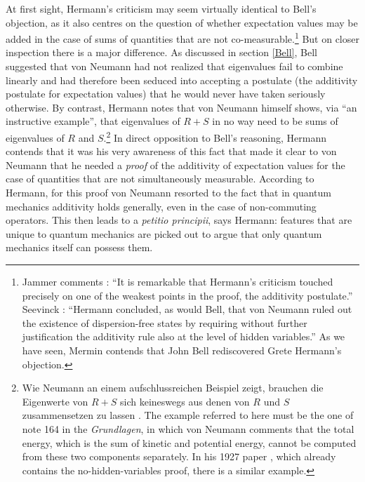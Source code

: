 \documentclass[12pt]{article}
\begin{document}
At first sight, Hermann's criticism may seem virtually identical to Bell's objection, as it also centres on the question of whether expectation values may be added in the case of sums of quantities that are not co-measurable.\footnote{Jammer comments \cite[p.\@ 274]{jammer}: ``It is remarkable that Hermann's criticism touched precisely on one of the weakest points in the proof, the additivity postulate.'' Seevinck \cite[p.\@ 122]{seevinck}: ``Hermann concluded, as would Bell, that von Neumann ruled out the existence of dispersion-free states by requiring without further justification the additivity rule also at the level of hidden variables.'' As we have seen, Mermin \cite{mermin} contends that John Bell rediscovered Grete Hermann's objection.} But on closer inspection there is a major difference. As discussed in section \ref{Bell}, Bell suggested that von Neumann had not realized that eigenvalues fail to combine linearly and had therefore been seduced into accepting a postulate (the additivity postulate for expectation values) that he would never have taken seriously otherwise. By contrast, Hermann notes that von Neumann himself shows, via ``an instructive example'', that eigenvalues of $R + S$ in no way need to be sums of eigenvalues of $R$ and $S$.\footnote{Wie Neumann an einem aufschlussreichen Beispiel zeigt, brauchen die Eigenwerte von $R + S$ sich keineswegs aus denen von $R$ und $S$ zusammensetzen zu lassen \cite[p.\@ 19]{hermann3}. The example referred to here must be the one of note 164 in the \emph{Grundlagen}, in which von Neumann comments that the total energy, which is the sum of kinetic and potential energy, cannot be computed from these two components separately. In his 1927 paper \cite{VN2}, which already contains the no-hidden-variables proof, there is a similar example.} In direct opposition to Bell's reasoning, Hermann contends that it was his very awareness of this fact that made it clear to von Neumann that he needed a \emph{proof} of the additivity of expectation values for the case of quantities that are not simultaneously measurable. According to Hermann, for this proof von Neumann resorted to the fact that in quantum mechanics additivity holds generally, even in the case of non-commuting operators. This then leads to a \emph{petitio principii}, says Hermann: features that are unique to quantum mechanics are picked out to argue that only quantum mechanics itself can possess them.
\end{document}
